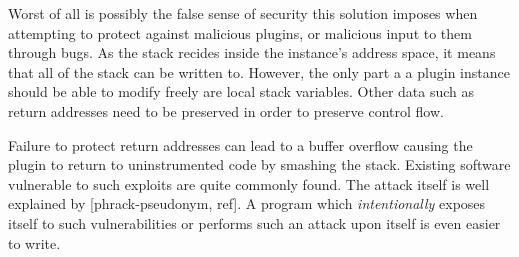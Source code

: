 Worst of all is possibly the false sense of security this solution imposes when
attempting to protect against malicious plugins, or malicious input to them
through bugs. As the stack recides inside the instance's address space, it means
that all of the stack can be written to. However, the only part a a plugin
instance should be able to modify freely are local stack variables. Other data
such as return addresses need to be preserved in order to preserve control flow.

Failure to protect return addresses can lead to a buffer overflow causing the
plugin to return to uninstrumented code by smashing the stack. Existing software
vulnerable to such exploits are quite commonly found. The attack itself is well
explained by  [phrack-pseudonym, ref]. A program which \emph{intentionally}
exposes itself to such vulnerabilities or performs such an attack upon itself is
even easier to write.
